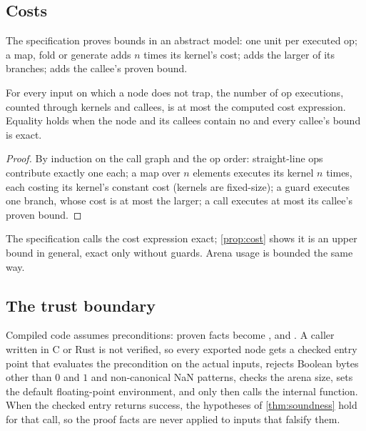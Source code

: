 \subsection{Costs}

The specification proves  bounds in an abstract model: one unit per executed op; a
map, fold or generate adds $n$ times its kernel's cost;  adds the larger of
its branches;  adds the callee's proven bound.

\begin{proposition}\label{prop:cost}
For every input on which a node does not trap, the number of op executions, counted through
kernels and callees, is at most the computed cost expression. Equality holds when the node and
its callees contain no  and every callee's bound is exact.
\end{proposition}
\begin{proof}
By induction on the call graph and the op order: straight-line ops contribute exactly one each;
a map over $n$ elements executes its kernel $n$ times, each costing its kernel's constant cost
(kernels are fixed-size); a guard executes one branch, whose cost is at most the larger; a call
executes at most its callee's proven bound.
\end{proof}

The specification calls the cost expression exact; \cref{prop:cost} shows it is an upper bound
in general, exact only without guards. Arena usage is bounded the same way.

\subsection{The trust boundary}

Compiled code assumes preconditions: proven facts become ,  and
. A caller written in C or Rust is not verified, so every exported node gets a
checked entry point that evaluates the precondition on the actual inputs, rejects Boolean
bytes other than $0$ and $1$ and non-canonical NaN patterns, checks the arena size, sets the
default floating-point environment, and only then calls the internal function. When the checked
entry returns success, the hypotheses of \cref{thm:soundness} hold for that call, so the proof
facts are never applied to inputs that falsify them.
